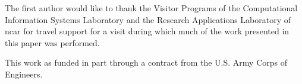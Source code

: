 


%





\begin{acks}
  The first author would like to thank the Visitor Programs of the Computational Information Systems Laboratory
  and the Research Applications Laboratory of \gls{ncar} for travel support for a visit during which much of
  the work presented in this paper was performed.

  This work as funded in part through a contract from the U.S. Army Corps of Engineers.

\end{acks}
